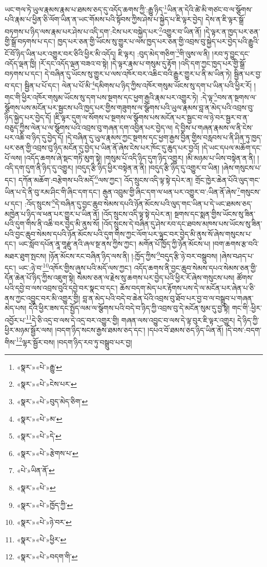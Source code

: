 ཡང་གལ་ཏེ་ཡུལ་རྣམས་རྣམ་པ་ཐམས་ཅད་དུ་འདོད་ཆགས་ཀྱི་:རྒྱུ་ཉིད་\footnote{«སྣར་»«པེ་»རྒྱུ་}ཡིན་ན་དེའི་ཚེ་མི་གཙང་བ་ལ་སྩོགས་པའི་རྣམ་པ་ཕྱིན་ཅི་ལོག་ཡིན་ན་ཡང་གོམས་པའི་སྟོབས་ཀྱིས་ཤེས་པ་སྐྱེད་པ་ཇི་ལྟར་བྱེད། དེས་ན་ཇི་ལྟར་སྒྲོ་བཏགས་པ་ཉིད་ལས་རྣམ་པར་ཤེས་པ་འདི་དག་:ངེས་པར་བསྐྱེད་པར་\footnote{«སྣར་»«པེ་»ངེས་པར་}འགྱུར་བ་ཡིན་ནོ། །དེ་ལྟར་ན་ཁྱད་པར་ཅན་གྱི་སྒྲོ་བཏགས་པ་དང་། ཁྱད་པར་ཅན་གྱི་ཡོངས་སུ་གྱུར་པ་ལས་ཁྱད་པར་ཅན་གྱི་འབྲས་བུ་སྐྱེད་པར་བྱེད་པའི་རྒྱུའི་ངོ་བོ་ཉིད་ཡིན་པར་འགྱུར་བར་ཅིའི་ཕྱིར་མི་འདོད། ཇི་ལྟར། :བུད་མེད་གཅིག་\footnote{«སྣར་»«པེ་»བུད་མེད་ཅིག་}གི་ལུས་ལ་ནི། །རབ་ཏུ་བྱུང་དང་འདོད་ལྡན་ཁྱི། །རོ་དང་འདོད་ལྡན་བཟའ་བ་སྟེ། །དེ་ལྟར་རྣམ་པ་གསུམ་དུ་རྟོག །འདི་དག་ཀྱང་ཁྱད་པར་གྱི་སྒྲོ་བཏགས་པ་དང་། དེ་བཞིན་དུ་ཡོངས་སུ་གྱུར་པ་ལས་འཁོར་བར་འཆིང་བའི་རྒྱུར་གྱུར་པ་ནི་མ་ཡིན་ཏེ། སྦྱིན་པར་བྱ་བ་དང་། སྦྱིན་པ་པོ་དང་། ལེན་པ་པོ་མི་\footnote{«སྣར་»«པེ་»མ་}དམིགས་པ་ཉིད་ཀྱིས་འཁོར་གསུམ་ཡོངས་སུ་དག་པ་ཡིན་པའི་ཕྱིར་རོ། །གང་གི་ཕྱིར་འཁོར་གསུམ་ཡོངས་སུ་དག་པས་སྔགས་དང་ཕྱག་རྒྱའི་རྣམ་པར་འགྱུར་ཏེ། :དེ་ལྟ་\footnote{«སྣར་»«པེ་»དེ་}བས་ན་སྔགས་ལ་སྩོགས་པས་མངོན་པར་སྦྱངས་པའི་ཁྱད་པར་གྱིས་གཟུགས་ལ་སྩོགས་པའི་ཡུལ་རྣམས་བླ་ན་མེད་པའི་འབྲས་བུ་ཉིད་སྐྱེད་པར་བྱེད་དོ། །ཇི་ལྟར་དུག་ལ་སོགས་པ་སྔགས་ལ་སྩོགས་པས་མངོན་པར་སྦྱང་བ་ལ་ཉེ་བར་སྦྱར་བ་ན་བཅུད་ཀྱིས་ལེན་པ་ལ་སྩོགས་པའི་འབྲས་བུ་གཞན་དག་འབྱིན་པར་བྱེད་ལ། དེ་བྱིས་པ་གཞན་རྣམས་ལ་ནི་ངེས་པར་འཆི་བ་ཉིད་དུ་བྱེད་དོ། །དེ་བཞིན་དུ་ཡུལ་རྣམས་ཀྱང་སྔགས་དང་ཕྱག་རྒྱས་བྱིན་གྱིས་བརླབས་པ་ནི་ཤིན་ཏུ་ཁྱད་པར་ཅན་གྱི་འབྲས་བུ་ཉིད་མངོན་དུ་བྱེད་པ་ཡིན་ནོ་ཞེས་ངེས་པར་ཁོང་དུ་ཆུད་པར་བྱའོ། །དེ་ཡང་དཔལ་མཆོག་དང་པོ་ལས། །འདོད་ཆགས་ཞེ་སྡང་གཏི་མུག་སྟེ། །གསུམ་པོ་འདི་ཉིད་དུག་ཉིད་འགྱུར། །མི་མཉམ་པ་ཡིས་བསྟེན་ན་ནི། །འདི་དག་དུག་ནི་ཉིད་དུ་འགྱུར། །བདུད་རྩི་ཉིད་ཕྱིར་བསྟེན་ན་ནི། །བདུད་རྩི་ཉིད་དུ་འགྱུར་བ་ཡིན། །ཞེས་གསུངས་པ་དང་། དཀོན་མཆོག་:བརྩེགས་པའི་མདོ་\footnote{«སྣར་»«པེ་»རྩེགས་པ་}ལས་ཀྱང་། འོད་སྲུངས་འདི་ལྟ་སྟེ་དཔེར་ན། གྲོང་ཁྱེར་ཆེན་པོའི་ལུད་གང་ཡིན་པ་དེ་ནི་བུ་རམ་ཤིང་གི་ཞིང་དག་དང་། རྒུན་འབྲུམ་གྱི་ཞིང་དག་ལ་ཕན་པར་འགྱུར་བ་:ཡིན་ནོ་ཞེས་\footnote{«པེ་»ཡིན་ནོ་}གསུངས་པ་དང་། :འོད་སྲུངས་\footnote{«སྣར་»«པེ་»}དེ་བཞིན་དུ་བྱང་ཆུབ་སེམས་དཔའི་ཉོན་མོངས་པའི་ལུད་གང་ཡིན་པ་དེ་ཡང་ཐམས་ཅད་མཁྱེན་པ་ཉིད་ལ་ཕན་པར་གྱུར་པ་ཡིན་ནོ། །འོད་སྲུངས་འདི་ལྟ་སྟེ་དཔེར་ན། སྔགས་དང་སྨན་གྱིས་ཡོངས་སུ་ཟིན་པའི་དུག་གིས་ནི་འཆི་བར་བྱེད་མི་ནུས་སོ། །འོད་སྲུངས་དེ་བཞིན་དུ་ཤེས་རབ་དང་ཐབས་མཁས་པས་ཡོངས་སུ་ཟིན་པའི་བྱང་ཆུབ་སེམས་དཔའི་ཉོན་མོངས་པའི་དུག་གིས་ཀྱང་ལོག་པར་ལྟུང་བར་བྱེད་མི་ནུས་སོ་ཞེས་གསུངས་པ་དང་། ཡང་སློབ་དཔོན་ནཱ་གཱརྫུ་ནའི་ཞལ་སྔ་ནས་ཀྱིས་ཀྱང་། མགོན་པོ་ཁྱོད་ཀྱི་ཉོན་མོངས་པ། །བག་ཆགས་རྩ་བའི་མཐར་ཐུག་སྤངས། །ཉོན་མོངས་རང་བཞིན་ཉིད་ལས་ནི། །:ཁྱོད་ཀྱིས་\footnote{«སྣར་»«པེ་»ཁྱོད་ཀྱི་}བདུད་རྩི་ཉེ་བར་བསྒྲུབས། །ཞེས་བཤད་པ་དང་། ཡང་:ཉེ་བ་\footnote{«སྣར་»«པེ་»ཉེ་བར་}འཁོར་གྱིས་ཞུས་པའི་མདོ་ལས་ཀྱང་། འདོད་ཆགས་ནི་བྱང་ཆུབ་སེམས་དཔའ་སེམས་ཅན་གྱི་དོན་ཆེན་པོ་ཉིད་ཀྱིས་འཇུག་སྟེ། སེམས་ཅན་ལ་རྗེས་སུ་ཆགས་པར་བྱེད་པའི་ཕྱིར་རོ་ཞེས་གསུངས་པས། ཚོགས་པའི་དབྱེ་བ་ལས་འབྲས་བུའི་དབྱེ་བར་སྣང་བ་དང་། ཆོས་བདག་མེད་པར་རྟོགས་པས་དེ་ལ་མངོན་པར་ཞེན་པ་ཅི་ནས་ཀྱང་འབྱུང་བར་མི་འགྱུར་གྱི། བླ་ན་མེད་པའི་བདེ་བ་ཆེན་པོའི་འབྲས་བུ་ཐོབ་པར་བྱ་བ་ལ་བསྒྲུབ་པ་གཞན་མེད་པས། དེའི་ཕྱིར་ཟས་དང་སྤྱོད་ལམ་ལ་སྩོགས་པའི་བདེ་བ་ཉིད་ཀྱི་འབྲས་བུ་དེ་མངོན་སུམ་དུ་བྱ་སྟེ། གང་གི་:ཕྱིར་འབྱོར་པ་\footnote{«སྣར་»«པེ་»ཕྱིར་}དེ་ཅི་འདྲ་བ་ལས་དེ་འདྲ་བར་འགྱུར་གྱི། གཞན་ལས་འབྱུང་བ་ལས་དེ་ལྟ་བུར་ཇི་ལྟར་འགྱུར། དེ་ཉིད་ཀྱི་ཕྱིར་མཉམ་སྦྱོར་ལས། །བདག་ཉིད་སངས་རྒྱས་ཐམས་ཅད་དང་། །དཔའ་བོ་ཐམས་ཅད་ཉིད་ཡིན་ནོ། །དེ་བས་:བདག་གིས་\footnote{«སྣར་»«པེ་»བདག་གི་}ལྷར་སྦྱོར་བས། །བདག་ཉིད་རབ་ཏུ་བསྒྲུབ་པར་བྱ། 